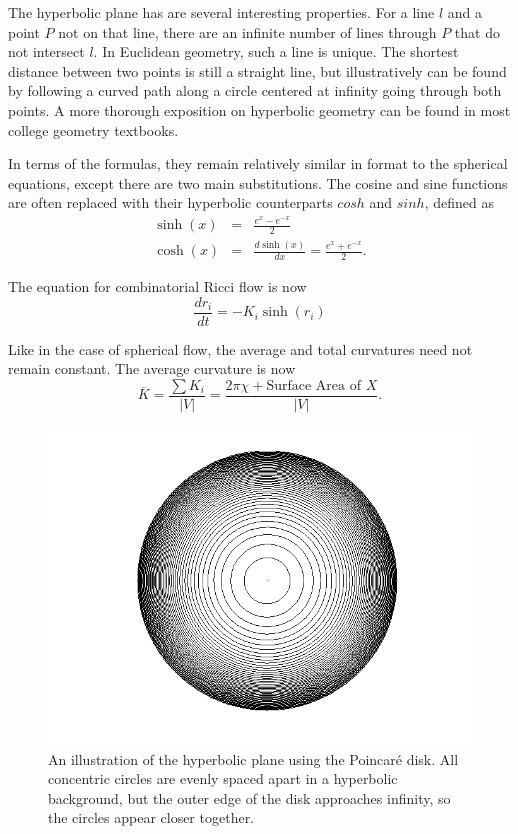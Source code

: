\documentclass[12pt]{article}
\begin{document}
 The hyperbolic plane has are several interesting properties. For a line $l$ and a point $P$ not on that line, there are an infinite number of lines through $P$ that do not intersect $l$. In Euclidean geometry, such a line is unique. The shortest distance between two points is still a straight line, but illustratively can be found by following a curved path along a circle centered at infinity going through both points. A more thorough exposition on hyperbolic geometry can be found in most college geometry textbooks.

 In terms of the formulas, they remain relatively similar in format to the spherical equations, except there are two main substitutions. The cosine and sine functions are often replaced with their hyperbolic counterparts $cosh$ and $sinh$, defined as
\begin{eqnarray*}
\sinh(x) &=& \frac{e^x - e^{-x}}{2}\\
\cosh(x) &=& \frac{d\sinh(x)}{dx} = \frac{e^x + e^{-x}}{2}.
\end{eqnarray*}

 The equation for combinatorial Ricci flow is now
\begin{equation}
\label{HRiccif}
\frac{dr_i}{dt} = -K_i\sinh(r_i)
\end{equation}
 

 Like in the case of spherical flow, the average and total curvatures need not remain constant. The average curvature is now
$$\overline{K} = \frac{\sum{K_i}}{|V|} = \frac{2\pi\chi + \mbox{Surface Area of }X}{|V|}.$$

\begin{figure}
\centering
\includegraphics[scale = 0.5]{Pictures3/pDisk.png}
\caption{An illustration of the hyperbolic plane using the Poincar\'{e} disk. All concentric circles are evenly spaced apart in a hyperbolic background, but the outer edge of the disk approaches infinity, so the circles appear closer together.}
\label{PD}
\end{figure}
\end{document}

